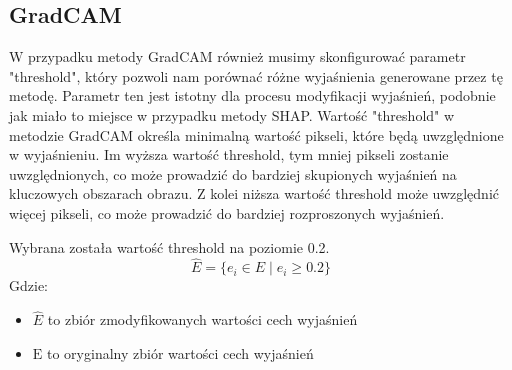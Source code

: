 \subsection*{GradCAM}
W przypadku metody GradCAM również musimy skonfigurować parametr "threshold", który pozwoli nam porównać różne wyjaśnienia generowane przez tę metodę.
Parametr ten jest istotny dla procesu modyfikacji wyjaśnień, podobnie jak miało to miejsce w przypadku metody SHAP.
Wartość "threshold" w metodzie GradCAM określa minimalną wartość pikseli, które będą uwzględnione w wyjaśnieniu.
Im wyższa wartość threshold, tym mniej pikseli zostanie uwzględnionych, co może prowadzić do bardziej skupionych wyjaśnień na kluczowych obszarach obrazu.
Z kolei niższa wartość threshold może uwzględnić więcej pikseli, co może prowadzić do bardziej rozproszonych wyjaśnień.

Wybrana została wartość threshold na poziomie 0.2.
\begin{equation}
	\hat{E} =  \{ e_i \in E \mid e_i \geq 0.2 \}
	\label{eq:modified_explanation_gradcam}
\end{equation}
Gdzie:
\begin{itemize}[label=]
	\item $\hat{E}$ to zbiór zmodyfikowanych wartości cech wyjaśnień
	\item $\text{E}$ to oryginalny zbiór wartości cech wyjaśnień
\end{itemize}

